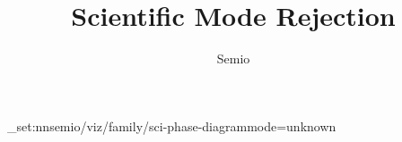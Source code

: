 \documentclass[type=paper,language=en,theme=light]{semio}
\title{Scientific Mode Rejection}
\author{Semio}
\date{}
\begin{document}
\SemioVizProbePage
\ExplSyntaxOn\keys_set:nn{semio/viz/family/sci-phase-diagram}{mode=unknown}\ExplSyntaxOff
{}
\SemioVizProbeEnd
\end{document}
